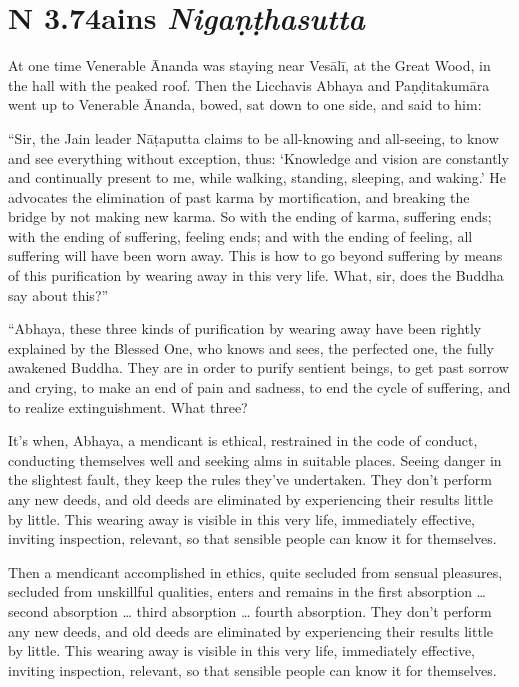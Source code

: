 \documentclass[12pt,openany]{book}%
\newcommand*{\suttatitleacronym}[1]{\smaller[2]{#1}\vspace*{.3em}}
\newcommand*{\suttatitletranslation}[1]{\linebreak{#1}}
\newcommand*{\suttatitleroot}[1]{\linebreak\smaller[2]\itshape{#1}}
\newcommand*{\tocacronym}[1]{\hspace*{-3.3em}{#1}\quad}
\newcommand*{\toctranslation}[1]{#1}
\newcommand*{\tocroot}[1]{(\textit{#1})}
\begin{document}
%
\section*{{\suttatitleacronym AN 3.74}{\suttatitletranslation Jains }{\suttatitleroot Nigaṇṭhasutta}}
\addcontentsline{toc}{section}{\tocacronym{AN 3.74} \toctranslation{Jains } \tocroot{Nigaṇṭhasutta}}

At one time Venerable Ānanda was staying near \textsanskrit{Vesālī}, at the Great Wood, in the hall with the peaked roof. Then the Licchavis Abhaya and \textsanskrit{Paṇḍitakumāra} went up to Venerable Ānanda, bowed, sat down to one side, and said to him: 

“Sir, the Jain leader \textsanskrit{Nāṭaputta} claims to be all-knowing and all-seeing, to know and see everything without exception, thus: ‘Knowledge and vision are constantly and continually present to me, while walking, standing, sleeping, and waking.’ He advocates the elimination of past karma by mortification, and breaking the bridge by not making new karma. So with the ending of karma, suffering ends; with the ending of suffering, feeling ends; and with the ending of feeling, all suffering will have been worn away. This is how to go beyond suffering by means of this purification by wearing away in this very life. What, sir, does the Buddha say about this?” 

“Abhaya, these three kinds of purification by wearing away have been rightly explained by the Blessed One, who knows and sees, the perfected one, the fully awakened Buddha. They are in order to purify sentient beings, to get past sorrow and crying, to make an end of pain and sadness, to end the cycle of suffering, and to realize extinguishment. What three? 

It’s when, Abhaya, a mendicant is ethical, restrained in the code of conduct, conducting themselves well and seeking alms in suitable places. Seeing danger in the slightest fault, they keep the rules they’ve undertaken. They don’t perform any new deeds, and old deeds are eliminated by experiencing their results little by little. This wearing away is visible in this very life, immediately effective, inviting inspection, relevant, so that sensible people can know it for themselves. 

Then a mendicant accomplished in ethics, quite secluded from sensual pleasures, secluded from unskillful qualities, enters and remains in the first absorption … second absorption … third absorption … fourth absorption. They don’t perform any new deeds, and old deeds are eliminated by experiencing their results little by little. This wearing away is visible in this very life, immediately effective, inviting inspection, relevant, so that sensible people can know it for themselves. 
\end{document}
